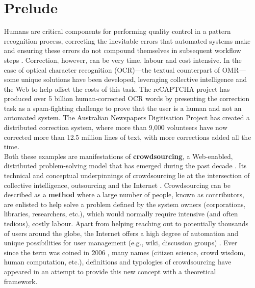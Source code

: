 \documentclass[letterpaper,10pt,pagesize=pdftex,headings=normal]{scrreprt}
\begin{document}
\chapter{Prelude}

Humans are critical components for performing quality control in a pattern recognition process, correcting the inevitable errors that automated systems make and ensuring these errors do not compound themselves in subsequent workflow steps \citep{hankinson2012b,burlet2012}. Correction, however, can be very time, labour and cost intensive. In the case of optical character recognition (OCR)---the textual counterpart of OMR---some unique solutions have been developed, leveraging collective intelligence and the Web to help offset the costs of this task. The reCAPTCHA project \citep{ahn2008} has produced over 5 billion human-corrected OCR words by presenting the correction task as a spam-fighting challenge to prove that the user is a human and not an automated system. The Australian Newspapers Digitisation Project \citep{holley2009} has created a distributed correction system, where more than 9,000 volunteers have now corrected more than 12.5 million lines of text, with more corrections added all the time.\\

\noindent Both these examples are manifestations of \textbf{crowdsourcing}, a Web-enabled, distributed problem-solving model that has emerged during the past decade \citep{brabham2013}. Its technical and conceptual underpinnings of crowdsourcing lie at the intersection of collective intelligence, outsourcing and the Internet \citep{brabham2013,saxton2013}. Crowdsourcing can be described as a \textbf{method} where a large number of people, known as contributors, are enlisted to help solve a problem defined by the system owners (corporations, libraries, researchers, etc.), which would normally require intensive (and often tedious), costly labour. Apart from helping reaching out to potentially thousands of users around the globe, the Internet offers a high degree of automation and unique possibilities for user management (e.g., wiki, discussion groups) \citep{doan2011}. Ever since the term was coined in 2006 \citep{howe2006}, many names (citizen science, crowd wisdom, human computation, etc.), definitions \citep{arolas2012} and typologies \citep{geiger2011} of crowdsourcing have appeared in an attempt to provide this new concept with a theoretical framework.\\
\end{document}
